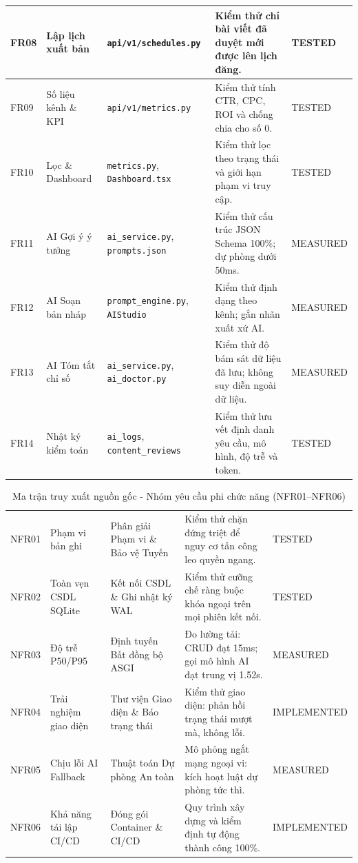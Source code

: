 \begin{table}[H]
\begin{tabularx}{\textwidth}{|C{0.9cm}|L{2.5cm}|L{3.3cm}|Y|C{2.1cm}|}
\hline
FR08 & Lập lịch xuất bản & \texttt{api/v1/schedules.py} & Kiểm thử chỉ bài viết đã duyệt mới được lên lịch đăng. & TESTED\\
\hline
FR09 & Số liệu kênh \& KPI & \texttt{api/v1/metrics.py} & Kiểm thử tính CTR, CPC, ROI và chống chia cho số 0. & TESTED\\
\hline
FR10 & Lọc \& Dashboard & \texttt{metrics.py}, \texttt{Dashboard.tsx} & Kiểm thử lọc theo trạng thái và giới hạn phạm vi truy cập. & TESTED\\
\hline
FR11 & AI Gợi ý ý tưởng & \texttt{ai\_service.py}, \texttt{prompts.json} & Kiểm thử cấu trúc JSON Schema 100\%; dự phòng dưới 50ms. & MEASURED\\
\hline
FR12 & AI Soạn bản nháp & \texttt{prompt\_engine.py}, \texttt{AIStudio} & Kiểm thử định dạng theo kênh; gắn nhãn xuất xứ AI. & MEASURED\\
\hline
FR13 & AI Tóm tắt chỉ số & \texttt{ai\_service.py}, \texttt{ai\_doctor.py} & Kiểm thử độ bám sát dữ liệu đã lưu; không suy diễn ngoài dữ liệu. & MEASURED\\
\hline
FR14 & Nhật ký kiểm toán & \texttt{ai\_logs}, \texttt{content\_reviews} & Kiểm thử lưu vết định danh yêu cầu, mô hình, độ trễ và token. & TESTED\\
\hline
\end{tabularx}
\end{table}

\begin{table}[H]
\centering
\scriptsize
\renewcommand{\arraystretch}{0.96}
\caption{Ma trận truy xuất nguồn gốc - Nhóm yêu cầu phi chức năng (NFR01--NFR06)}\label{tab:v9-traceability-nfr}
\begin{tabularx}{\textwidth}{|C{0.9cm}|L{2.5cm}|L{3.3cm}|Y|C{2.1cm}|}
\hline
{} &  &  &  & \\
\hline
NFR01 & Phạm vi bản ghi & Phân giải Phạm vi \& Bảo vệ Tuyến & Kiểm thử chặn đứng triệt để nguy cơ tấn công leo quyền ngang. & TESTED\\
\hline
NFR02 & Toàn vẹn CSDL SQLite & Kết nối CSDL \& Ghi nhật ký WAL & Kiểm thử cưỡng chế ràng buộc khóa ngoại trên mọi phiên kết nối. & TESTED\\
\hline
NFR03 & Độ trễ P50/P95 & Định tuyến Bất đồng bộ ASGI & Đo lường tải: CRUD đạt 15ms; gọi mô hình AI đạt trung vị 1.52s. & MEASURED\\
\hline
NFR04 & Trải nghiệm giao diện & Thư viện Giao diện \& Báo trạng thái & Kiểm thử giao diện: phản hồi trạng thái mượt mà, không lỗi. & IMPLEMENTED\\
\hline
NFR05 & Chịu lỗi AI Fallback & Thuật toán Dự phòng An toàn & Mô phỏng ngắt mạng ngoại vi: kích hoạt luật dự phòng tức thì. & MEASURED\\
\hline
NFR06 & Khả năng tái lập CI/CD & Đóng gói Container \& CI/CD & Quy trình xây dựng và kiểm định tự động thành công 100\%. & IMPLEMENTED\\
\hline
\end{tabularx}
\end{table}


